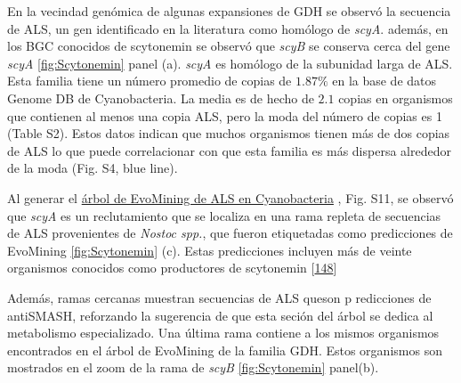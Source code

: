 \documentclass[12pt,twoside]{reedthesis}
\begin{document}
  En la vecindad genómica de algunas expansiones de GDH se observó la
  secuencia de ALS, un gen identificado en la literatura como homólogo de
  \emph{scyA}. además, en los BGC conocidos de scytonemin se observó que
  \emph{scyB} se conserva cerca del gene \emph{scyA}
  \autoref{fig:Scytonemin} panel (a). \emph{scyA} es homólogo de la
  subunidad larga de ALS. Esta familia tiene un número promedio de copias
  de \(1.87\%\) en la base de datos Genome DB de Cyanobacteria. La media
  es de hecho de \(2.1\) copias en organismos que contienen al menos una
  copia ALS, pero la moda del número de copias es 1 (Table S2). Estos
  datos indican que muchos organismos tienen más de dos copias de ALS lo
  que puede correlacionar con que esta familia es más dispersa alrededor
  de la moda (Fig. S4, blue line).
  
  Al generar el
  \href{https://microreact.org/project/B11HkUtdm?tt=cr.}{árbol de
  EvoMining de ALS en Cyanobacteria} , Fig. S11, se observó que
  \emph{scyA} es un reclutamiento que se localiza en una rama repleta de
  secuencias de ALS provenientes de \emph{Nostoc spp.}, que fueron
  etiquetadas como predicciones de EvoMining \autoref{fig:Scytonemin} (c).
  Estas predicciones incluyen más de veinte organismos conocidos como
  productores de scytonemin
  {[}\protect\hyperlink{ref-balskus_investigating_2008}{148}{]}
  
  Además, ramas cercanas muestran secuencias de ALS queson p redicciones
  de antiSMASH, reforzando la sugerencia de que esta seción del árbol se
  dedica al metabolismo especializado. Una última rama contiene a los
  mismos organismos encontrados en el árbol de EvoMining de la familia
  GDH. Estos organismos son mostrados en el zoom de la rama de \emph{scyB}
  \autoref{fig:Scytonemin} panel(b).
  
\end{document}
